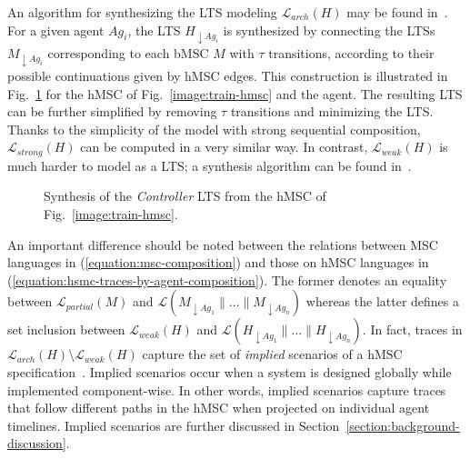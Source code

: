 An algorithm for synthesizing the LTS modeling $\mathcal{L}_{arch}(H)$ may be found in~\cite{Uchitel:2004}. For a given agent $Ag_{i}$, the LTS $H_{\downarrow Ag_i}$ is synthesized by connecting the LTSs $M_{\downarrow Ag_i}$ corresponding to each bMSC $M$ with $\tau$ transitions, according to their possible continuations given by hMSC edges. This construction is illustrated in Fig.~\ref{image:train-controller-synthesis} for the hMSC of Fig.~\ref{image:train-hmsc} and the  agent. The resulting LTS can be further simplified by removing $\tau$ transitions and minimizing the LTS.  Thanks to the simplicity of the model with strong sequential composition, $\mathcal{L}_{strong}(H)$ can be computed in a very similar way. In contrast, $\mathcal{L}_{weak}(H)$ is much harder to model as a LTS; a synthesis algorithm can be found in~\cite{Uchitel:2004}.

\vspace{0.4cm}
\begin{figure}[H]\centering
{}
\caption{Synthesis of the \emph{Controller} LTS from the hMSC of Fig.~\ref{image:train-hmsc}.\label{image:train-controller-synthesis}}
\end{figure}

An important difference should be noted between the relations between MSC languages in (\ref{equation:msc-composition}) and those on hMSC languages in (\ref{equation:hsmc-traces-by-agent-composition}). The former denotes an equality between $\mathcal{L}_{partial}(M)$ and $\mathcal{L}(M_{\downarrow Ag_1}\parallel\ldots\parallel M_{\downarrow Ag_n})$ whereas the latter defines a set inclusion between $\mathcal{L}_{weak}(H)$ and $\mathcal{L}(H_{\downarrow Ag_1}\parallel\ldots\parallel H_{\downarrow Ag_n})$. In fact, traces in $\mathcal{L}_{arch}(H) \setminus \mathcal{L}_{weak}(H)$ capture the set of \emph{implied} scenarios of a hMSC specification~\cite{Alur:2000, Uchitel:2004}. Implied scenarios occur when a system is designed globally while implemented component-wise. In other words, implied scenarios capture traces that follow different paths in the hMSC when projected on individual agent timelines. Implied scenarios are further discussed in Section~\ref{section:background-discussion}.

